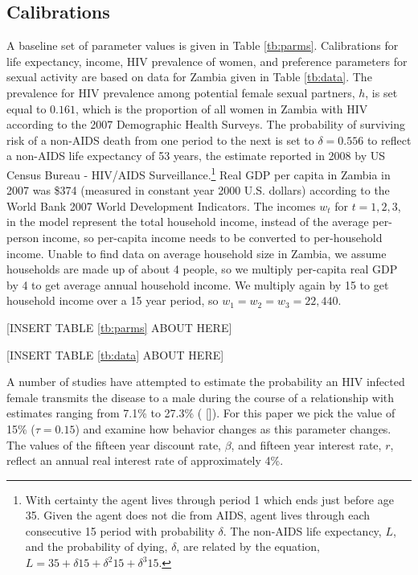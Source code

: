 \documentclass[12pt]{article}
\begin{document}
\subsection{Calibrations}
A baseline set of parameter values is given in Table \ref{tb:parms}.  Calibrations for life expectancy, income, HIV prevalence of women, and preference parameters for sexual activity are based on data for Zambia given in Table \ref{tb:data}.  The prevalence for HIV prevalence among potential female sexual partners, $h$, is set equal to $0.161$, which is the proportion of all women in Zambia with HIV according to the 2007 Demographic Health Surveys.  The probability of surviving risk of a non-AIDS death from one period to the next is set to $\delta=0.556$ to reflect a non-AIDS life expectancy of 53 years, the estimate reported in 2008 by US Census Bureau - HIV/AIDS Surveillance.\footnote{With certainty the agent lives through period 1 which ends just before age 35.  Given the agent does not die from AIDS, agent lives through each consecutive 15 period with probability $\delta$.  The non-AIDS life expectancy, $L$, and the probability of dying, $\delta$, are related by the equation, $L=35 + \delta 15 + \delta^2 15 + \delta^3 15$.}  Real GDP per capita in Zambia in 2007 was \$374 (measured in constant year 2000 U.S. dollars) according to the World Bank 2007 World Development Indicators.  The incomes $w_t$ for $t=1,2,3$, in the model represent the total household income, instead of the average per-person income, so per-capita income needs to be converted to per-household income.  Unable to find data on average household size in Zambia, we assume households are made up of about 4 people, so we multiply per-capita real GDP by 4 to get average annual household income.  We multiply again by 15 to get household income over a 15 year period, so $w_1=w_2=w_3=22,440$.

\begin{center}[INSERT TABLE \ref{tb:parms} ABOUT HERE]\end{center}

\begin{center}[INSERT TABLE \ref{tb:data} ABOUT HERE]\end{center}

A number of studies have attempted to estimate the probability an HIV infected female transmits the disease to a male during the course of a relationship with estimates ranging from 7.1\% to 27.3\% ( [\citeyear{eo2009}]).  For this paper we pick the value of 15\% ($\tau=0.15$) and examine how behavior changes as this parameter changes.  The values of the fifteen year discount rate, $\beta$, and fifteen year interest rate, $r$, reflect an annual real interest rate of approximately 4\%.
\end{document}
